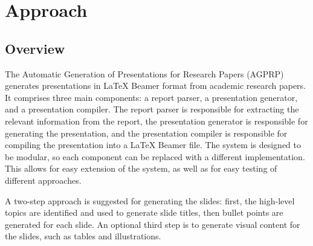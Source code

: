 \chapter{Approach}
\label{ch:approach}


\section{Overview}

The Automatic Generation of Presentations for Research Papers (AGPRP) generates presentations in \LaTeX{} Beamer format from academic research papers. It comprises three main components: a report parser, a presentation generator, and a presentation compiler. The report parser is responsible for extracting the relevant information from the report, the presentation generator is responsible for generating the presentation, and the presentation compiler is responsible for compiling the presentation into a \LaTeX{} Beamer file. The system is designed to be modular, so each component can be replaced with a different implementation. This allows for easy extension of the system, as well as for easy testing of different approaches.


A two-step approach is suggested for generating the slides: first, the high-level topics are identified and used to generate slide titles, then bullet points are generated for each slide. An optional third step is to generate visual content for the slides, such as tables and illustrations.

